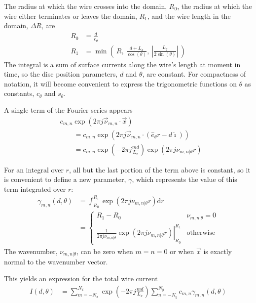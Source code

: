 \documentclass{article}
\def\d{\mathrm{d}}
\def\x{\vec{x}}
\def\vnu{\vec{\nu}_{m,n}}
\def\nuth{\nu_{m,n|\theta}}
\def\ui{\hat{\imath}}
\begin{document}
The radius at which the wire crosses into the domain, $R_0$, the radius at which the wire either terminates or leaves the domain, $R_1$, and the wire length in the domain, $\Delta R$, are
\begin{align}
R_0 &= \frac{d}{c_\theta}\\
R_1 &= \min\left(\ R,\ \frac{d + L_x}{\cos(\theta)},\ \left|\frac{L_y}{2\sin(\theta)}\right|\ \right)
\end{align}
The integral is a sum of surface currents along the wire's length at moment in time, so the disc position parameters, $d$ and $\theta$, are constant.  For compactness of notation, it will become convenient to express the trigonometric functions on $\theta$ as constants, $c_\theta$ and $s_\theta$.

A single term of the Fourier series appears
\begin{align*}
&c_{m,n} \exp\left(2\pi j \vnu \cdot \x \right)\\
&\hspace{2em}= c_{m,n} \exp\left(2\pi j \vnu \cdot (\hat{e}_\theta r - d \ui) \right)\\
&\hspace{2em}= c_{m,n} \exp\left(-2\pi j \frac{md}{L_x} \right) \exp\left(2\pi j \nuth r \right)
\end{align*}


For an integral over $r$, all but the last portion of the term above is constant, so it is convenient to define a new parameter, $\gamma$, which represents the value of this term integrated over $r$:
\begin{align}
\gamma_{m,n}(d,\theta) &= \int_{R_0}^{R_1} \exp\left(2\pi j \nuth r \right) \d r \nonumber\\
 &= \left\{\begin{array}{c|l}
 R_1 - R_0 & \nuth = 0\\
 \left.\frac{1}{2\pi j \nuth}\exp\left(2\pi j \nuth r \right)\right|^{R_1}_{R_0} & \mathrm{otherwise}
\end{array}
\right.
\end{align}
The wavenumber, $\nuth$, can be zero when $m=n=0$ or when $\x$ is exactly normal to the wavenumber vector.

This yields an expression for the total wire current
\begin{align}
I(d,\theta) &= \sum_{m=-N_x}^{N_x} \exp\left(-2\pi j \frac{md}{L_x} \right) \sum_{n=-N_y}^{N_y} c_{m,n} \gamma_{m,n}(d,\theta)
\end{align}
\end{document}
